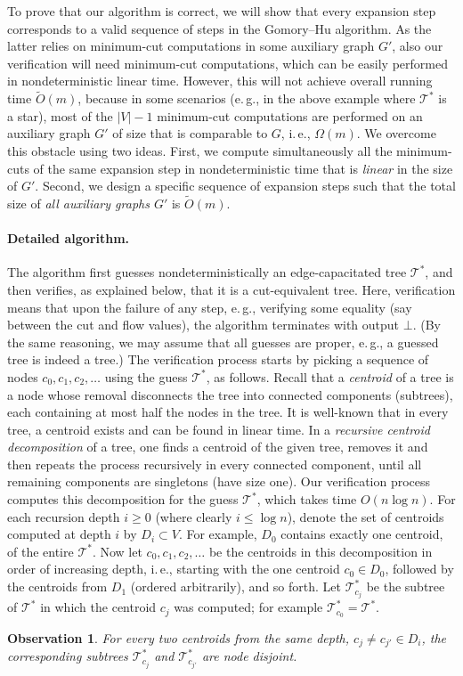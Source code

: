 \documentclass[11pt]{article}
\numberwithin{equation}{section}
\theoremstyle{definition}
\theoremstyle{plain}
\newcommand{\ie}{i.\,e.}
\newcommand{\eg}{e.\,g.}
\newtheorem{observation}[theorem]{Observation}
\theoremstyle{plain}
\newcommand\tO{\ensuremath{\widetilde O}}  %
\newcommand{\TG}{\mathcal{T}^*}
\providecommand{\card}[1]{\lvert#1\rvert}
\begin{document}
To prove that our algorithm is correct, we will show that every expansion step
corresponds to a valid sequence of steps in the Gomory--Hu algorithm.
As the latter relies on minimum-cut computations in some auxiliary graph $G'$,
also our verification will need minimum-cut computations,
which can be easily performed in nondeterministic linear time.
However, this will not achieve overall running time $\tO(m)$,
because in some scenarios (\eg, in the above example where $\TG$ is a star),
most of the $\card{V}-1$ minimum-cut computations are performed
on an auxiliary graph $G'$ of size that is comparable to $G$, \ie, $\Omega(m)$.
We overcome this obstacle using two ideas.
First, we compute simultaneously all the minimum-cuts of the same expansion step
in nondeterministic time that is \emph{linear} in the size of $G'$.
Second, we design a specific sequence of expansion steps
such that the total size of \emph{all auxiliary graphs $G'$} is $\tO(m)$.

\paragraph{Detailed algorithm.}

The algorithm first guesses nondeterministically an edge-capacitated tree $\TG$,
and then verifies, as explained below, that it is a cut-equivalent tree.
Here, verification means that upon the failure of any step,
\eg, verifying some equality (say between the cut and flow values),
the algorithm terminates with output $\bot$.
(By the same reasoning, we may assume that all guesses are proper,
\eg, a guessed tree is indeed a tree.)
%
The verification process starts by picking
a sequence of nodes $c_0,c_1,c_2,\ldots$ using the guess $\TG$,
as follows.
Recall that a \emph{centroid} of a tree is a node
whose removal disconnects the tree into connected components (subtrees),
each containing at most half the nodes in the tree.
It is well-known that in every tree,
a centroid exists and can be found in linear time.
In a \emph{recursive centroid decomposition} of a tree,
one finds a centroid of the given tree, removes it
and then repeats the process recursively in every connected component,
until all remaining components are singletons (have size one).
Our verification process computes this decomposition for the guess $\TG$,
which takes time $O(n\log n)$.
For each recursion depth $i\ge 0$ (where clearly $i\le \log n$),
denote the set of centroids computed at depth $i$ by $D_i\subset V$.
For example, $D_0$ contains exactly one centroid, of the entire $\TG$.
Now let $c_0,c_1,c_2,\ldots$ be the centroids in this decomposition
in order of increasing depth, \ie, starting with the one centroid $c_0\in D_0$,
followed by the centroids from $D_1$ (ordered arbitrarily), and so forth.
Let $\TG_{c_j}$ be the subtree of $\TG$ in which the centroid $c_j$ was computed; for example $\TG_{c_0}=\TG$.
\begin{observation}\label{observation:disjoint}
For every two centroids from the same depth,
$c_j\neq c_{j'}\in D_i$,
the corresponding subtrees $\TG_{c_j}$ and $\TG_{c_{j'}}$ are node disjoint.
\end{observation}
\end{document}
